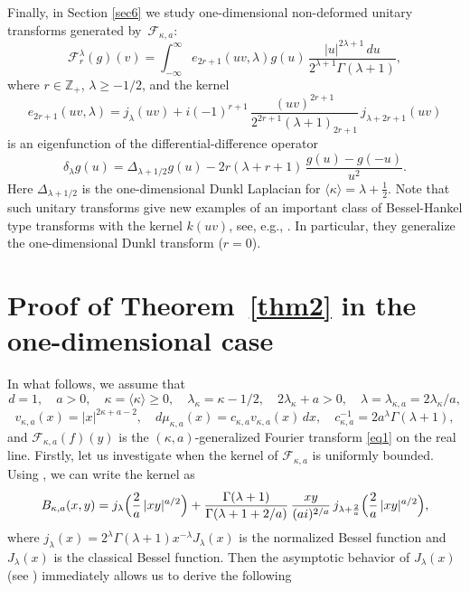 \documentclass[12pt,twoside,reqno]{amsart}\usepackage[cp1251]{inputenc}
\theoremstyle{plain}
\theoremstyle{remark}
\begin{document}
Finally, in Section \ref{sec6} we study one-dimensional non-deformed unitary transforms generated by~$\mathcal{F}_{\kappa,a}$:
\begin{equation*}%
\mathcal{F}_{r}^{\lambda}(g)(v)=\int_{-\infty}^{\infty}e_{2r+1}(uv,\lambda)g(u)\,\frac{|u|^{2\lambda+1}
\,du}{2^{\lambda+1}\Gamma(\lambda+1)},
\end{equation*}
where $r\in\mathbb{Z}_+$, $\lambda\ge-1/2$, and the kernel
\[
e_{2r+1}(uv,\lambda)=j_{\lambda}(uv)+i(-1)^{r+1}\,\frac{(uv)^{2r+1}}{2^{2r+1}(\lambda+1)_{2r+1}}\,
j_{\lambda+2r+1}(uv)
\]
is an eigenfunction of the differential-difference operator
\[
\delta_{\lambda}g(u)=\Delta_{\lambda+1/2}g(u)-2r(\lambda+r+1)\,\frac{g(u)-g(-u)}{u^2}.
\]
Here $\Delta_{\lambda+1/2}$ is the one-dimensional Dunkl Laplacian for
$\langle \kappa\rangle=\lambda+\frac{1}{2}$.
Note that such unitary transforms give new examples of an important class of Bessel-Hankel type   transforms  with the kernel  $k(uv)$, see, e.g.,  \cite[Chap.~VIII]{Ti48}. In particular, they generalize the one-dimensional Dunkl transform ($r=0$).

\vspace{0.6mm}
\section{Proof of Theorem~\ref{thm2} in the one-dimensional case}\label{sec2}

In what follows, we assume that
\[
d=1,\quad a>0,\quad \kappa=\langle\kappa\rangle\ge 0,\quad \lambda_{\kappa}=\kappa-1/2,\quad 2\lambda_{\kappa}+a>0,\quad\lambda=\lambda_{\kappa,a}=2\lambda_{\kappa}/a,
\]
\[
v_{\kappa,a}(x)=|x|^{2\kappa+a-2},\quad
d\mu_{\kappa,a}(x)=c_{\kappa,a}v_{\kappa,a}(x)\,dx,\quad
c_{\kappa,a}^{-1}=2a^{\lambda}\Gamma(\lambda+1),
\]
 and $\mathcal{F}_{\kappa,a}(f)(y)$
is the $(\kappa,a)$-generalized Fourier transform \eqref{eq1} on the real line.
Firstly, let us investigate when the kernel of $\mathcal{F}_{\kappa,a}$ is uniformly bounded.
Using \cite[Sect.~5]{SKO12}, we can write the kernel as
\begin{equation}\label{eq4}
B_{\kappa,a}(x,y)=j_{\lambda}\Bigl(\frac{2}{a}\,|xy|^{a/2}\Bigr)+
\frac{\Gamma(\lambda+1)}{\Gamma(\lambda+1+2/a)}\,\frac{xy}{(ai)^{2/a}}\,
j_{\lambda+\frac{2}{a}}\Bigl(\frac{2}{a}\,|xy|^{a/2}\Bigr),
\end{equation}
{where} $j_{\lambda}(x)=2^{\lambda}\Gamma(\lambda+1)x^{-\lambda}J_{\lambda}(x)$
is the normalized  Bessel function and  $J_{\lambda}(x)$ is the classical Bessel
function.
Then the asymptotic behavior  of  $J_{\lambda}(x)$ (see \cite[Chapt.~VII, 7.1]{Wa66})
 immediately allows us to derive
the following
\end{document}
